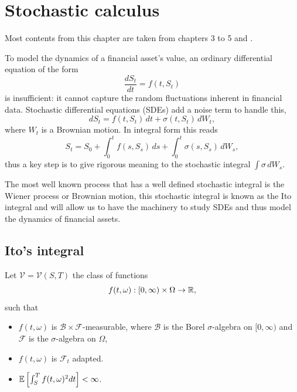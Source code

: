 
\chapter{Stochastic calculus}

Most contents from this chapter are taken from \cite{oksendal_sde} chapters 3 to 5 and \cite{steele_stochastic}.

To model the dynamics of a financial asset's value,
an ordinary differential equation of the form
\begin{equation*}
    \frac{dS_t}{dt} = f(t, S_t)
\end{equation*}
is insufficient: it cannot capture the random fluctuations inherent in financial data.
Stochastic differential equations (SDEs) add a noise term to handle this,
\begin{equation}\label{eq:sde}
    dS_t = f(t, S_t)\, dt + \sigma(t, S_t)\, dW_t,
\end{equation}
where $W_t$ is a Brownian motion.
In integral form this reads
\begin{equation}\label{eq:int_sde}
    S_t = S_0 + \int^{t}_{0} f(s, S_s)\, ds + \int^{t}_{0} \sigma(s, S_s)\, dW_s,
\end{equation}
thus a key step is to give rigorous meaning to the stochastic integral $\int \sigma\, dW_s$.

The most well known process that has a well defined stochastic integral is the Wiener process or Brownian motion,
this stochastic integral is known as the Ito integral and will allow us to have the machinery to study SDEs and thus model the dynamics of financial assets.

\section{Ito's integral}

\begin{definition}\label{def:ito_integral_reqs}
    Let $\mathcal{V} = \mathcal{V}(S, T)$ the class of functions
    \begin{equation*}
        f(t, \omega): [0, \infty) \times \Omega \to \mathbb{R},
    \end{equation*}
    such that
    \begin{itemize}
        \item $f(t, \omega)$ is $\mathcal{B} \times \mathcal{F}$-measurable, where $\mathcal{B}$ is the Borel $\sigma$-algebra on $[0, \infty)$ and $\mathcal{F}$ is the $\sigma$-algebra on $\Omega$,
        \item $f(t, \omega)$ is $\mathcal{F}_t$ adapted.
        \item $\mathbb{E} \left[ \int^{T}_{S} f(t, \omega)^2 dt \right] < \infty$.
    \end{itemize}
\end{definition}

